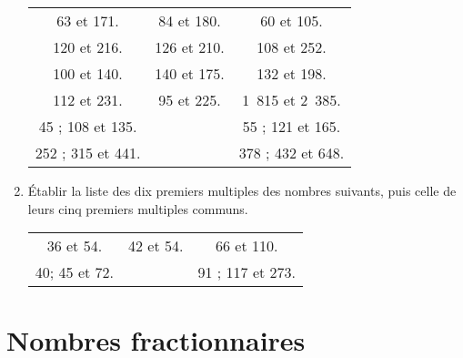 \documentclass[12 pt]{report}
\theoremstyle{plain}
\newcounter{n}
\begin{document}
\begin{enumerate}
\begin{center}\begin{tabular}{ccc}
63 et 171. & 84 et 180. & 60 et 105.\\
120 et 216. & 126 et 210. & 108 et 252. \\ 
100 et 140. & 140 et 175. & 132 et 198. \\
112 et 231. & 95 et 225. & 1~815 et 2~385. \\
45 ; 108 et 135. &  & 55 ; 121 et 165.\\
252 ; 315 et 441. & & 378 ; 432 et 648. 
\end{tabular} \end{center}

\item Établir la liste des dix premiers multiples des
nombres suivants, puis celle de leurs cinq premiers
multiples communs. 
\begin{center}\begin{tabular}{ccc} 
36 et 54. & 42 et 54. & 66 et 110. \\
40; 45 et 72. & & 91 ; 117 et 273.\end{tabular}
\end{center}
\end{enumerate}
\part{Nombres fractionnaires}
\end{document}
